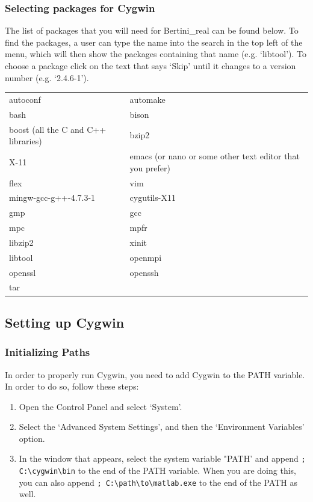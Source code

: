 		\subsubsection*{Selecting packages for Cygwin}
The list of packages that you will need for Bertini\_real can be found below. To find the packages, a user can type the name into the search in the top left of the menu,  which will then show the packages containing that name (e.g. `libtool'). To choose a package click on the text that says `Skip' until it changes to a version number (e.g. `2.4.6-1'). 

\begin{tabular}{ l l }
  autoconf & automake \\
  bash & bison \\
  boost (all the C and C++ libraries) & bzip2 \\
  X-11 & emacs (or nano or some other text editor that you prefer) \\
  flex & vim \\
  mingw-gcc-g++-4.7.3-1 & cygutils-X11 \\
  gmp & gcc \\
  mpc & mpfr \\
  libzip2 & xinit \\
   libtool & openmpi \\
  openssl& openssh \\
  tar & \\
\end{tabular}

	\subsection*{Setting up Cygwin}
		\subsubsection*{Initializing Paths}

In order to properly run Cygwin, you need to add Cygwin to the PATH variable. In order to do so, follow these steps:

\begin{enumerate}

\item Open the Control Panel and select `System'.

\item Select the `Advanced System Settings', and then the `Environment Variables' option. 

\item In the window that appears, select the system variable "PATH' and append \texttt{; C:\textbackslash{cygwin}\textbackslash {bin}} to the end of the PATH variable. When you are doing this, you can also append \texttt{; C:\textbackslash{path}\textbackslash{to}\textbackslash{matlab.exe}} to the end of the PATH as well.

\end{enumerate}

